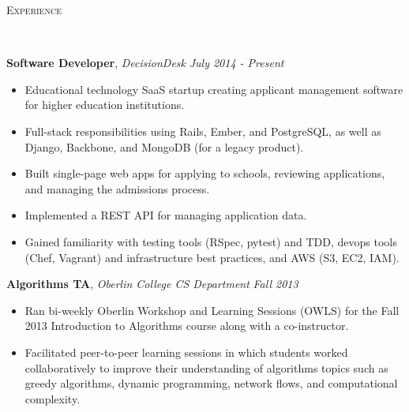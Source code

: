 \documentclass[9pt]{article}
\newenvironment{changemargin}[2]{%
  \begin{list}{}{%
    \setlength{\topsep}{0pt}%
    \setlength{\leftmargin}{#1}%
    \setlength{\rightmargin}{#2}%
    \setlength{\listparindent}{\parindent}%
    \setlength{\itemindent}{\parindent}%
    \setlength{\parsep}{\parskip}%
  }%
  \item[]}{\end{list}
}
\newcommand{\lineover}{
	\begin{changemargin}{-0.05in}{-0.05in}
		\vspace*{-8pt}
		\hrulefill \\
		\vspace*{-2pt}
	\end{changemargin}
}
\newcommand{\header}[1]{
	\begin{changemargin}{-0.5in}{-0.5in}
		\scshape{#1}\\
  	\lineover
	\end{changemargin}
}
\newenvironment{body} {
	\vspace*{-16pt}
	\begin{changemargin}{-0.25in}{-0.5in}
  }	
	{\end{changemargin}
}
\begin{document}
\smallskip

\header{Experience}

\begin{body}
	\vspace{14pt}

	\textbf{Software Developer}, \emph{DecisionDesk} \hfill \emph{July 2014 - Present}\\
	\vspace*{-4pt}
	\begin{itemize} \itemsep -0pt  %
		\item Educational technology SaaS startup creating applicant management software for higher education institutions.
		\item Full-stack responsibilities using Rails, Ember, and PostgreSQL, as well as Django, Backbone, and MongoDB (for a legacy product).
		\item Built single-page web apps for applying to schools, reviewing applications, and managing the admissions process.
		\item Implemented a REST API for managing application data.
		\item Gained familiarity with testing tools (RSpec, pytest) and TDD, devops tools (Chef, Vagrant) and infrastructure best practices, and AWS (S3, EC2, IAM).
	\end{itemize}

	\textbf{Algorithms TA}, \emph{Oberlin College CS Department} \hfill \emph{Fall 2013}\\
	\vspace*{-4pt}
	\begin{itemize} \itemsep -0pt  %
		\item Ran bi-weekly Oberlin Workshop and Learning Sessions (OWLS) for the Fall 2013 Introduction to Algorithms course along with a co-instructor.
		\item Facilitated peer-to-peer learning sessions in which students worked collaboratively to improve their understanding of algorithms topics such as greedy algorithms, dynamic programming, network flows, and computational complexity.
	\end{itemize}


\end{body}
\end{document}
